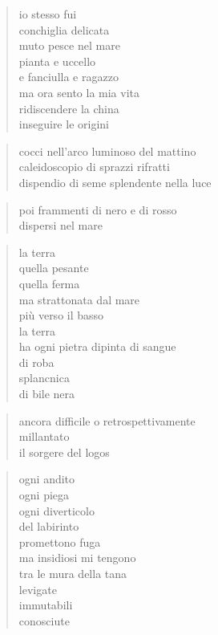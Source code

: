 	\begin{verse}
		io stesso fui\\
		conchiglia delicata\\
		muto pesce nel mare\\
		pianta e uccello\\
		e fanciulla e ragazzo\\
		ma ora sento la mia vita\\
		ridiscendere la china\\
		inseguire le origini
	\end{verse}


\clearpage



	\begin{verse}
		cocci nell’arco luminoso del mattino\\
		caleidoscopio di sprazzi rifratti\\
		dispendio di seme splendente nella luce
	\end{verse}

	\begin{verse}
		poi frammenti di nero e di rosso\\
		dispersi nel mare
	\end{verse}

	\begin{verse}
		la terra\\
		quella pesante\\
		quella ferma\\
		ma strattonata dal mare\\
		più verso il basso\\
		la terra\\
		ha ogni pietra dipinta di sangue\\
		di roba\\
		splancnica\\
		di bile nera
	\end{verse}

	\begin{verse}
		ancora difficile o retrospettivamente\\
		millantato\\
		il sorgere del logos
	\end{verse}


\clearpage



	\begin{verse}
		ogni andito\\
		ogni piega\\
		ogni diverticolo\\
		del labirinto\\
		promettono fuga\\
		ma insidiosi mi tengono\\
		tra le mura della tana\\
		levigate\\
		immutabili\\
		conosciute
	\end{verse}

